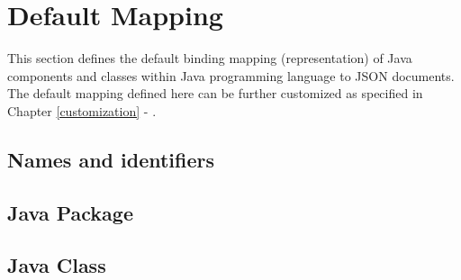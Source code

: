 \chapter{Default Mapping}
\label{defaultmapping}

This section defines the default binding mapping (representation) of Java components and classes within Java programming language to JSON documents. The default mapping defined here can be further customized as specified in Chapter \ref{customization} - .

\section{Names and identifiers}

\section{Java Package}

\section{Java Class}
